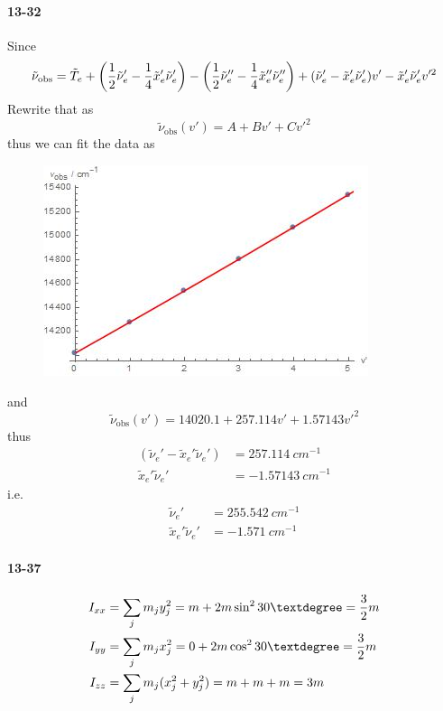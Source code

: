 \documentclass[a4paper]{article}
\newcommand{\ex}[1]{\paragraph{13-#1}}
\numberwithin{equation}{section}
\begin{document}
\ex{32}
Since
\begin{equation}\label{key}
\tilde{\nu}_{\text{obs}} = \tilde{T}_e + \qty(\dfrac{1}{2}\tilde{\nu}_e' - \dfrac{1}{4}\tilde{x}_e'\tilde{\nu}_e') - \qty(\dfrac{1}{2}\tilde{\nu}_e'' - \dfrac{1}{4}\tilde{x}_e''\tilde{\nu}_e'') + \qty(\tilde{\nu}_e' - \tilde{x}_e'\tilde{\nu}_e')v' - \tilde{x}_e'\tilde{\nu}_e'v'^2
\end{equation}
Rewrite that as
\begin{equation}\label{key}
\tilde{\nu}_{\text{obs}}(v') = A + Bv' + Cv'^2
\end{equation}
thus we can fit the data as
\begin{figure}[H]
	\centering
	\includegraphics[width=0.5\linewidth]{chap13-32.jpg}
\end{figure}
and
\begin{equation}\label{key}
\tilde{\nu}_{\text{obs}}(v') = 14020.1 + 257.114 v' + 1.57143 v'^2
\end{equation}
thus
\begin{align}
(\tilde{\nu}_e' - \tilde{x}_e'\tilde{\nu}_e') &= \SI{257.114}{cm^{-1}}\\
\tilde{x}_e'\tilde{\nu}_e' &= \SI{-1.57143}{cm^{-1}}
\end{align}
i.e.
\begin{align}
\tilde{\nu}_e' &= \SI{255.542}{cm^{-1}}\\
\tilde{x}_e'\tilde{\nu}_e' &= \SI{-1.571}{cm^{-1}}
\end{align}

\ex{37}
\begin{align}
I_{xx} &= \sum_j m_j y_j^2 = m + 2m\sin^2 30\textdegree = \dfrac{3}{2}m\\
I_{yy} &= \sum_j m_j x_j^2 = 0 + 2m\cos^2 30\textdegree = \dfrac{3}{2}m\\
I_{zz} &= \sum_j m_j( x_j^2 + y_j^2) = m + m + m = 3m
\end{align}
\end{document}
